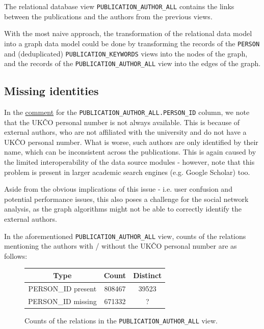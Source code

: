 The relational database view \texttt{PUBLICATION\_AUTHOR\_ALL} contains the links between the publications and the authors from the previous views.

With the most naive approach, the transformation of the relational data model into a graph data model could be done by transforming the records of the 
\texttt{PERSON} and (deduplicated) \texttt{PUBLICATION\_KEYWORDS} views into the nodes of the graph, 
and the records of the \texttt{PUBLICATION\_AUTHOR\_ALL} view into the edges of the graph.

\subsection{Missing identities}\label{sec:inferring-missing-identities}

    In the \hyperref[sec:pub-author-all]{comment} for the \texttt{PUBLICATION\_AUTHOR\_ALL.PERSON\_ID} column, we note that the \ac{UKČO} personal number is not always available.
    This is because of external authors, who are not affiliated with the university and do not have a \ac{UKČO} personal number.
What is worse, such authors are only identified by their name, which can be inconsistent across the publications.
This is again caused by the limited interoperability of the data source modules - however, note 
that this problem is present in larger academic search engines (e.g. Google Scholar) too.

Aside from the obvious implications of this issue - i.e. user confusion and potential performance issues,
this also poses a challenge for the social network analysis, as the graph algorithms might not be able 
to correctly identify the external authors.

    In the aforementioned \texttt{PUBLICATION\_AUTHOR\_ALL} view, counts of the relations mentioning the authors with / without the \ac{UKČO} personal number are as follows:

\begin{figure}[!ht]
    \captionsetup{width=.9\linewidth}
    \centering
    \begin{tabular}{|c|c|c|}
    \hline
        Type & Count & Distinct \\ \hline
        PERSON\_ID present & 808467 & 39523 \\ \hline
        PERSON\_ID missing & 671332 & ? \\ \hline
    \end{tabular}
    \caption{Counts of the relations in the \texttt{PUBLICATION\_AUTHOR\_ALL} view.}
\end{figure}

